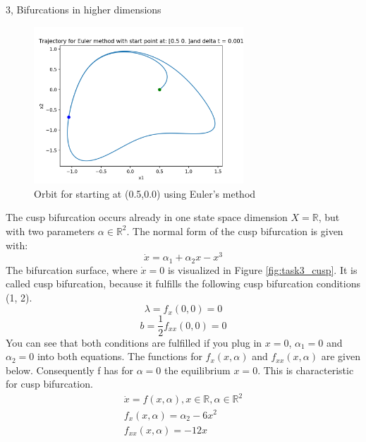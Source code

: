\documentclass[10pt,a4paper]{article}
\begin{document}
\begin{task}{3, Bifurcations in higher dimensions}
\begin{figure}[H]
    \label{fig:task3_orbit2}
\end{figure}
\begin{figure}[H]
    \centering
    \includegraphics[width=0.7\textwidth]{../plots/Figure_4.png}
    \caption{Orbit for starting at (0.5,0.0) using Euler's method}
    \label{fig:task3_orbit0.5}
\end{figure}
\bigbreak
The cusp bifurcation occurs already in one state space dimension $X=\mathbb{R}$, but with two parameters $\alpha \in \mathbb{R}^2$. The normal form of the cusp bifurcation is given with:
\begin{equation*}
    \dot{x} = \alpha_1 + \alpha_2x - x^3
\end{equation*}
The bifurcation surface, where $\dot{x} = 0$ is visualized in Figure \ref{fig:task3_cusp}. It is called cusp bifurcation, because it fulfills the following cusp bifurcation conditions (1, 2). \\
\begin{equation}
     \lambda = f_x(0,0) = 0 
\end{equation}
\begin{equation}
     b = \frac{1}{2}f_{xx}(0,0) = 0
\end{equation}
You can see that both conditions are fulfilled if you plug in $x = 0$, $\alpha_1 = 0$ and $\alpha_2 = 0$ into both equations. The functions for $f_x(x,\alpha)$ and $f_{xx}(x,\alpha)$ are given below. Consequently f has for $\alpha=0$ the equilibrium $x= 0$. This is characteristic for cusp bifurcation.
\begin{align*}
    \dot{x} = f(x,\alpha), x\in \mathbb{R}, \alpha \in \mathbb{R}^2 \\
    f_x(x,\alpha) = \alpha_2 - 6x^2 \\
    f_{xx}(x,\alpha) = -12x 
\end{align*}
\begin{figure}[H]

\end{figure}
\end{task}
\end{document}
